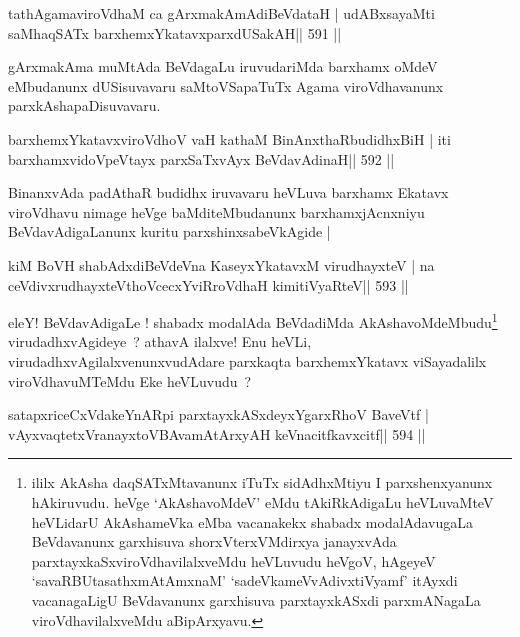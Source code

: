 
\begin{shl}
tathA\s\s gamaviroVdhaM ca gArxmakAmAdiBeVdataH |
udABxsayaMti saMhaqSATx barxhemxYkatavxparxdUSakAH\hfill || 591 ||
\end{shl}

\begin{artha}
gArxmakAma muMtAda BeVdagaLu iruvudariMda barxhamx oMdeV eMbudanunx dUSisuvavaru saMtoVSapaTuTx Agama viroVdhavanunx parxkAshapaDisuvavaru.
\end{artha}



\begin{shl}
barxhemxYkatavxviroVdhoV vaH kathaM BinAnxthaRbudidhxBiH |
iti barxhamxvidoVpeVtayx parxSaTxvAyx BeVdavAdinaH\hfill || 592 ||
\end{shl}

\begin{artha}
BinanxvAda padAthaR budidhx iruvavaru heVLuva barxhamx Ekatavx
viroVdhavu nimage heVge baMditeMbudanunx barxhamxjAcnxniyu
BeVdavAdigaLanunx kuritu parxshinxsabeVkAgide |
\end{artha}

\begin{shl}
kiM BoVH shabAdxdiBeVdeVna KaseyxYkatavxM virudhayxteV |
na ceVdivxrudhayxteV\s thoVcecxYviRroVdhaH kimitiVyaRteV\hfill || 593 ||
\end{shl}

\begin{artha}
eleY! BeVdavAdigaLe ! shabadx modalAda BeVdadiMda
AkAshavoMdeMbudu\footnote{ililx AkAsha daqSATxMtavanunx iTuTx
  sidAdhxMtiyu I parxshenxyanunx hAkiruvudu. heVge `AkAshavoMdeV' eMdu
  tAkiRkAdigaLu heVLuvaMteV heVLidarU AkAshameVka eMba vacanakekx
  shabadx modalAdavugaLa BeVdavanunx garxhisuva shorxVterxVMdirxya
  janayxvAda parxtayxkaSxviroVdhavilalxveMdu heVLuvudu heVgoV, hAgeyeV
  `savaRBUtasathxmAtAmxnaM' `sadeVkameVvAdivxtiVyamf' itAyxdi
  vacanagaLigU BeVdavanunx garxhisuva parxtayxkASxdi parxmANagaLa
  viroVdhavilalxveMdu aBipArxyavu.} virudadhxvAgideye~? athavA ilalxve! Enu
heVLi, virudadhxvAgilalxvenunxvudAdare parxkaqta barxhemxYkatavx
viSayadalilx viroVdhavuMTeMdu Eke heVLuvudu~?
\end{artha}

\begin{shl}
satapxriceCxVdakeYnARpi parxtayxkASxdeyxYgarxRhoV BaveVtf |
vAyxvaqtetxVranayxtoVBAvamAtArxyAH keVnacitfkavxcitf\hfill || 594 ||
\end{shl}

